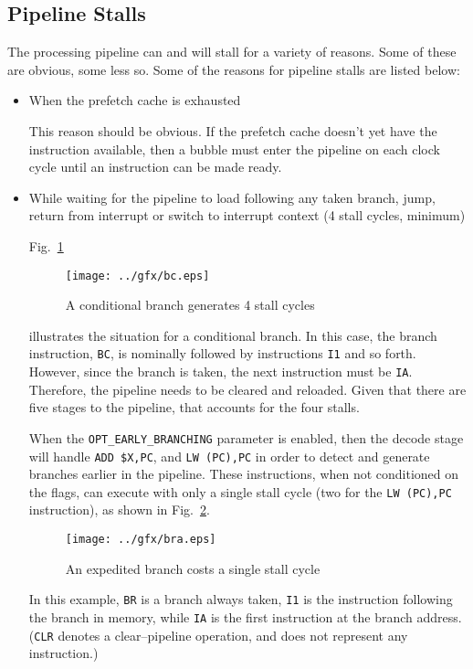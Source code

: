 \documentclass{gqtekspec}
\begin{document}
\subsection{Pipeline Stalls}
The processing pipeline can and will stall for a variety of reasons.  Some of
these are obvious, some less so.  Some of the reasons for pipeline stalls are
listed below:
\begin{itemize}
\item When the prefetch cache is exhausted

	This reason should be obvious.  If the prefetch cache doesn't yet have
	the instruction available, then a bubble must enter the pipeline on
	each clock cycle until an instruction can be made ready.

\item While waiting for the pipeline to load following any taken branch, jump,
	return from interrupt or switch to interrupt context (4 stall cycles,
	minimum)

Fig.~\ref{fig:bcstalls}
\begin{figure}\begin{center}
\texttt{[image: ../gfx/bc.eps]}
\caption{A conditional branch generates 4 stall cycles}\label{fig:bcstalls}
\end{center}\end{figure}
illustrates the situation for a conditional branch.  In this case, the branch
instruction, {\tt BC}, is nominally followed by instructions {\tt I1} and so
forth.  However, since the branch is taken, the next instruction must be
{\tt IA}.  Therefore, the pipeline needs to be cleared and reloaded.  Given
that there are five stages to the pipeline, that accounts for the four stalls.

When the {\tt OPT\_EARLY\_BRANCHING} parameter is enabled, then the decode
stage will handle {\tt ADD \$X,PC}, and {\tt LW (PC),PC} in order to detect
and generate branches earlier in the pipeline.  These instructions, when not
conditioned on the flags, can execute with only a single stall cycle (two for
the {\tt LW (PC),PC} instruction), as shown in Fig.~\ref{fig:branch}.
\begin{figure}\begin{center}
\texttt{[image: ../gfx/bra.eps]} %
\caption{An expedited branch costs a single stall cycle}\label{fig:branch}
\end{center}\end{figure}
In this example, {\tt BR} is a branch always taken, {\tt I1} is the instruction
following the branch in memory, while {\tt IA} is the first instruction at the
branch address.  ({\tt CLR} denotes a clear--pipeline operation, and does
not represent any instruction.)


\end{itemize}
\end{document}
